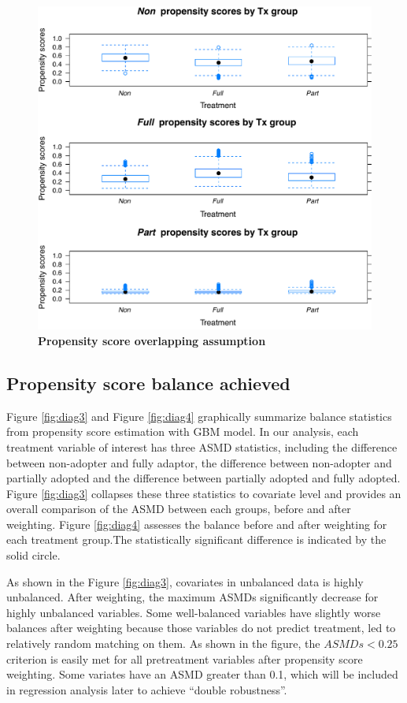 \documentclass[12pt]{report}
\begin{document}
\begin{figure}[!htb]
\begin{center}
\includegraphics[width=\textwidth]{psdiag2.pdf}
\caption{{\bf Propensity score overlapping assumption}}
\label{fig:diag2}
\end{center}
\end{figure}

\subsection{Propensity score balance achieved}
Figure \ref{fig:diag3} and Figure \ref{fig:diag4} graphically summarize balance statistics from propensity score estimation with GBM model. In our analysis, each treatment variable of interest has three ASMD statistics, including the difference between non-adopter and fully adaptor, the difference between non-adopter and partially adopted and the difference between partially adopted and fully adopted. Figure \ref{fig:diag3} collapses these three statistics to covariate level and provides an overall comparison of the ASMD between each groups, before and after weighting. Figure \ref{fig:diag4} assesses the balance before and after weighting for each treatment group.The statistically significant difference is indicated by the solid circle.

As shown in the Figure \ref{fig:diag3}, covariates in unbalanced data is highly unbalanced. After weighting, the maximum ASMDs significantly decrease for highly unbalanced variables. Some well-balanced variables have slightly worse balances after weighting because those variables do not predict treatment, led to relatively random matching on them. As shown in the figure, the $ASMDs<0.25$ criterion is easily met for all pretreatment variables after propensity score weighting. Some variates have an ASMD greater than 0.1, which will be included in regression analysis later to achieve ``double robustness''.
\end{document}
